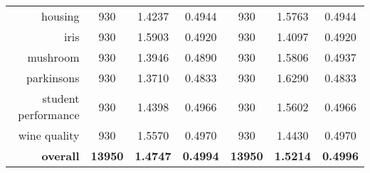 \begin{table}[H]
{\begin{tabular}{rcccccc}
			housing                            & 930                                             & \cellcolor[rgb]{ .776,  .937,  .808}\textcolor[rgb]{ 0,  .38,  0}{1.4237}          & 0.4944          & 930                               & 1.5763                                                                    & 0.4944          \\
			iris                               & 930                                             & 1.5903                                                                             & 0.4920          & 930                               & \cellcolor[rgb]{ .776,  .937,  .808}\textcolor[rgb]{ 0,  .38,  0}{1.4097} & 0.4920          \\
			mushroom                           & 930                                             & \cellcolor[rgb]{ .776,  .937,  .808}\textcolor[rgb]{ 0,  .38,  0}{1.3946}          & 0.4890          & 930                               & 1.5806                                                                    & 0.4937          \\
			parkinsons                         & 930                                             & \cellcolor[rgb]{ .776,  .937,  .808}\textcolor[rgb]{ 0,  .38,  0}{1.3710}          & 0.4833          & 930                               & 1.6290                                                                    & 0.4833          \\
			student performance                & 930                                             & \cellcolor[rgb]{ .776,  .937,  .808}\textcolor[rgb]{ 0,  .38,  0}{1.4398}          & 0.4966          & 930                               & 1.5602                                                                    & 0.4966          \\
			wine quality                       & 930                                             & 1.5570                                                                             & 0.4970          & 930                               & \cellcolor[rgb]{ .776,  .937,  .808}\textcolor[rgb]{ 0,  .38,  0}{1.4430} & 0.4970          \\
			\midrule
			\textbf{overall}                   & \textbf{13950}                                  & \cellcolor[rgb]{ .776,  .937,  .808}\textcolor[rgb]{ 0,  .38,  0}{\textbf{1.4747}} & \textbf{0.4994} & \textbf{13950}                    & \textbf{1.5214}                                                           & \textbf{0.4996} \\
		\end{tabular}%
	}
\end{table}%

